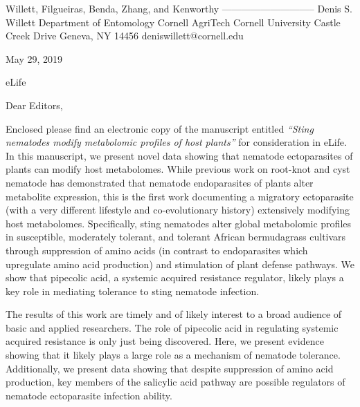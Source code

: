 \documentclass{article}
\begin{document}
\begin{addmargin}[2.8in]{}
Willett, Filgueiras, \newline
Benda, Zhang, and Kenworthy \newline
----------------------------- \newline
Denis S. Willett\newline
Department of Entomology \newline
Cornell AgriTech  \newline
Cornell University  Castle Creek Drive \newline
Geneva, NY 14456 \newline
deniswillett@cornell.edu \newline
\end{addmargin}
\setlength{\parindent}{0cm}

May 29, 2019

\vspace{1.24em}

eLife

\vspace{1.24em}

Dear Editors,

\vspace{0.48em}
\setlength{\parindent}{1.24cm}

Enclosed please find an electronic copy of the manuscript entitled \textit{“Sting nematodes modify metabolomic profiles of host plants”} for consideration in eLife.  In this manuscript, we present novel data showing that nematode ectoparasites of plants can modify host metabolomes.  While previous work on root-knot and cyst nematode has demonstrated that nematode endoparasites of plants alter metabolite expression, this is the first work documenting a migratory ectoparasite (with a very different lifestyle and co-evolutionary history) extensively modifying host metabolomes.  Specifically, sting nematodes alter global metabolomic profiles in susceptible, moderately tolerant, and tolerant African bermudagrass cultivars through suppression of amino acids (in contrast to endoparasites which upregulate amino acid production) and stimulation of plant defense pathways.  We show that pipecolic acid, a systemic acquired resistance regulator, likely plays a key role in mediating tolerance to sting nematode infection.  


The results of this work are timely and of likely interest to a broad audience of basic and applied researchers. The role of pipecolic acid in regulating systemic acquired resistance is only just being discovered.  Here, we present evidence showing that it likely plays a large role as a mechanism of nematode tolerance.  Additionally, we present data showing that despite suppression of amino acid production, key members of the salicylic acid pathway are possible regulators of nematode ectoparasite infection ability.  
\end{document}
